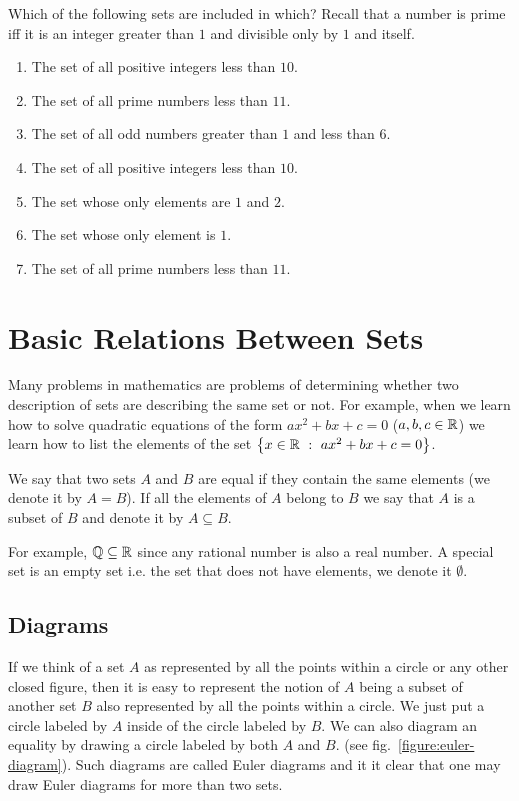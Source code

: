 \begin{exercise}
  \label{exercise:inclusion}

  Which of the following sets are included in which? Recall that a number is
  prime iff it is an integer greater than $1$ and divisible only by $1$ and
  itself.
  \begin{enumerate}
    \item The set of all positive integers less than $10$.
    \item The set of all prime numbers less than $11$.
    \item The set of all odd numbers greater than $1$ and less than $6$.
    \item The set of all positive integers less than $10$.
    \item The set whose only elements are $1$ and $2$.
    \item The set whose only element is $1$.
    \item The set of all prime numbers less than $11$.
  \end{enumerate}
\end{exercise}

\section{Basic Relations Between Sets}
Many problems in mathematics are problems of determining whether two description
of sets are describing the same set or not. For example, when we learn how to
solve quadratic equations of the form $ax^2 + bx + c = 0$ ($a, b, c \in \mathbb{R}$) we
learn how to list the elements of the set $\set[ax^2 + bx + c = 0]{x \in \R}$.

We say that two sets $A$ and $B$ are equal if they contain the
same elements (we denote it by $A = B$). If all the elements of $A$ belong to
$B$ we say that $A$ is a subset of $B$ and denote it by $A \subseteq B$.

For example, $\mathbb{Q} \subseteq \mathbb{R}$ since any rational number is
also a real number.
A special set is an empty set i.e. the set that does not have elements, we
denote it $\emptyset$.

\subsection{Diagrams}
If we think of a set $A$ as represented by all the points within a circle or
any other closed figure, then it is easy to represent the notion of $A$ being a
subset of another set $B$ also represented by all the points within a circle.
We just put a circle labeled by $A$ inside of the circle labeled by $B$. We can
also diagram an equality by drawing a circle labeled by both $A$ and $B$. (see
fig.~\ref{figure:euler-diagram}). Such diagrams are called Euler diagrams and
it it clear that one may draw Euler diagrams for more than two sets.

